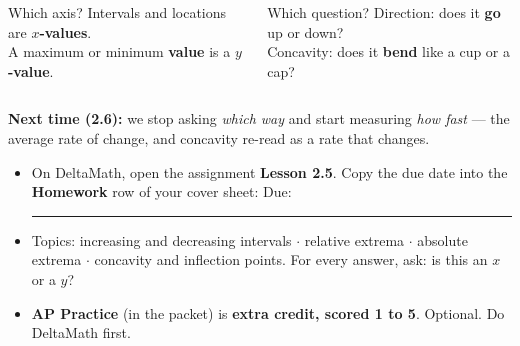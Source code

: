 \documentclass[aspectratio=169, 11pt]{beamer}
\begin{document}
\begin{frame}[t, plain]

  \begin{columns}[T]
      \begin{block}{Which axis?}
        Intervals and locations are \textbf{$x$-values}.\\[3pt]
        A maximum or minimum \textbf{value} is a \textbf{$y$-value}.
      \end{block}
      \begin{block}{Which question?}
        Direction: does it \textbf{go} up or down?\\[3pt]
        Concavity: does it \textbf{bend} like a cup or a cap?
      \end{block}
  \end{columns}

  \bigskip
  \textbf{Next time (2.6):} we stop asking \emph{which way} and start measuring \emph{how
  fast} --- the average rate of change, and concavity re-read as a rate that changes.
\end{frame}

\begin{frame}[t, plain]

  \begin{itemize}\setlength{\itemsep}{8pt}
    \item On DeltaMath, open the assignment \textbf{Lesson 2.5}. Copy the due date into the
          \textbf{Homework} row of your cover sheet: \quad Due: \rule{3cm}{0.4pt}
    \item Topics: increasing and decreasing intervals $\cdot$ relative extrema $\cdot$
          absolute extrema $\cdot$ concavity and inflection points. For every answer, ask:
          is this an $x$ or a $y$?
    \item \textbf{AP Practice} (in the packet) is \textbf{extra credit, scored 1 to 5}. Optional.
          Do DeltaMath first.
  \end{itemize}
\end{frame}
\end{document}

